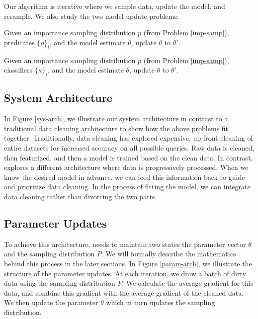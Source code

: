 Our algorithm is iterative where we sample data, update the model, and resample.
We also study the two model update problems:
\begin{problem}
Given an importance sampling distribution $p$ (from Problem \ref{imp-samp}), predicates $\{\rho\}_i$, and the model estimate $\theta$, update $\theta$ to $\theta'$.
\end{problem}

\begin{problem}
Given an importance sampling distribution $p$ (from Problem \ref{imp-samp}), classifiers $\{\kappa\}_i$, and the model estimate $\theta$, update $\theta$ to $\theta'$.
\end{problem}

\subsection{System Architecture}
In Figure \ref{sys-arch}, we illustrate our system architecture in contrast to a traditional data cleaning architecture to show how the above problems fit together.
Traditionally, data cleaning has explored expensive, up-front cleaning of entire datasets for increased accuracy on all possible queries.
Raw data is cleaned, then featurized, and then a model is trained based on the clean data.
In contrast, \sys explores a different architecture where data is progressively processed.
When we know the desired model in advance, we can feed this information back to guide and prioritize data cleaning.
In the process of fitting the model, we can integrate data cleaning rather than divorcing the two parts.

\subsection{Parameter Updates}
To achieve this architecture, \sys needs to maintain two states the parameter vector $\theta$ and the sampling distribution $P$.
We will formally describe the mathematics behind this process in the later sections.
In Figure \ref{param-arch}, we illustrate the structure of the parameter updates.
At each iteration, we draw a batch of dirty data using the sampling distribution $P$.
We calculate the average gradient for this data, and combine this gradient with the average gradient of the cleaned data.
We then update the parameter $\theta$ which in turn updates the sampling distribution.

